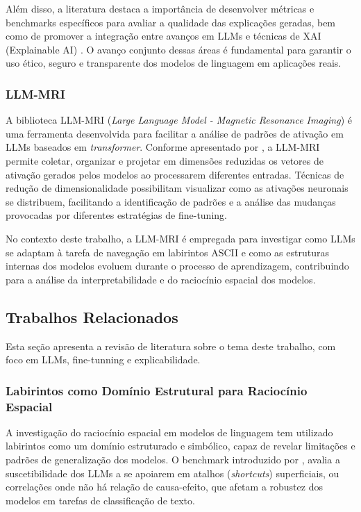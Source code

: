 Além disso, a literatura destaca a importância de desenvolver métricas e benchmarks específicos para avaliar a qualidade das explicações geradas, bem como de promover a integração entre avanços em LLMs e técnicas de XAI (Explainable AI) \cite{cambria2024xai}. O avanço conjunto dessas áreas é fundamental para garantir o uso ético, seguro e transparente dos modelos de linguagem em aplicações reais.

\subsubsection{LLM-MRI}

A biblioteca LLM-MRI (\textit{Large Language Model - Magnetic Resonance Imaging}) é uma ferramenta desenvolvida para facilitar a análise de padrões de ativação em LLMs baseados em \textit{transformer}. Conforme apresentado por \cite{costa2024llmmri}, a LLM-MRI permite coletar, organizar e projetar em dimensões reduzidas os vetores de ativação gerados pelos modelos ao processarem diferentes entradas. Técnicas de redução de dimensionalidade possibilitam visualizar como as ativações neuronais se distribuem, facilitando a identificação de padrões e a análise das mudanças provocadas por diferentes estratégias de fine-tuning.

No contexto deste trabalho, a LLM-MRI é empregada para investigar como LLMs se adaptam à tarefa de navegação em labirintos ASCII e como as estruturas internas dos modelos evoluem durante o processo de aprendizagem, contribuindo para a análise da interpretabilidade e do raciocínio espacial dos modelos.
\subsection{Trabalhos Relacionados}

Esta seção apresenta a revisão de literatura sobre o tema deste trabalho, com foco em LLMs, fine-tunning e explicabilidade.

\subsubsection{Labirintos como Domínio Estrutural para Raciocínio Espacial}

A investigação do raciocínio espacial em modelos de linguagem tem utilizado labirintos como um domínio estruturado e simbólico, capaz de revelar limitações e padrões de generalização dos modelos. O benchmark introduzido por \cite{zhou2024navigatingshortcutmazecomprehensive}, avalia a suscetibilidade dos LLMs a se apoiarem em atalhos (\textit{shortcuts}) superficiais, ou correlações onde não há relação de causa-efeito, que afetam a robustez dos modelos em tarefas de classificação de texto.

